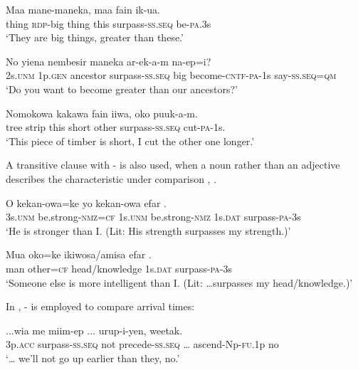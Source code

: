 \ea%
\label{ex:6:x1327}
\gll Maa  mane-maneka,  maa  fain    ik-ua. \\
thing  \textsc{rdp}-big  thing  this  surpass-\textsc{ss}.\textsc{seq}  be-\textsc{pa}.3s\\
\glt `They are big things, greater than these.'
\z

\ea%
\label{ex:6:x1328}
\gll No  yiena  nembesir    maneka ar-ek-a-m  na-ep=i?\\
2s.\textsc{unm}  1p.\textsc{gen}  ancestor  surpass-\textsc{ss}.\textsc{seq}  big become-\textsc{cntf}-\textsc{pa}-1s  say-\textsc{ss}.\textsc{seq}=\textsc{qm}\\
\glt `Do you want to become greater than our ancestors?'
\z

\ea%
\label{ex:6:x1333}
\gll Nomokowa  kakawa  fain  iiwa,  oko    puuk-a-m. \\
tree  strip  this  short  other  surpass-\textsc{ss}.\textsc{seq}  cut-\textsc{pa}-1s.\\
\glt `This piece of timber is short, I cut the other one longer.'
\z

A transitive clause with - is also used, when a noun rather than an adjective describes the characteristic under comparison , . 

\ea%
\label{ex:6:x1329}
\gll O  kekan-owa=ke  yo  kekan-owa  efar .\\
3s.\textsc{unm}  be.strong-\textsc{nmz}=\textsc{cf}  1s.\textsc{unm}  be.strong-\textsc{nmz}  1s.\textsc{dat} surpass-\textsc{pa}-3s\\
\glt `He is stronger than I. (Lit: His strength surpasses my strength.)'
\z

\ea%
\label{ex:6:x1894}
\gll Mua  oko=ke  ikiwosa/amisa  efar  . \\
man  other=\textsc{cf}  head/knowledge  1s.\textsc{dat}  surpass-\textsc{pa}-3s\\
\glt `Someone else is more intelligent than I. (Lit: {\dots}surpasses my head/knowledge.)'
\z

In , - is employed to compare arrival times:

\ea%
\label{ex:6:x1895}
\gll ...wia    me  miim-ep  ... urup-i-yen,  weetak.\\
3p.\textsc{acc}  surpass-\textsc{ss}.\textsc{seq}  not  precede-\textsc{ss}.\textsc{seq}  {\dots} ascend-Np-\textsc{fu}.1p  no\\
\glt `{\dots} we'll not go up earlier than they, no.'
\z

